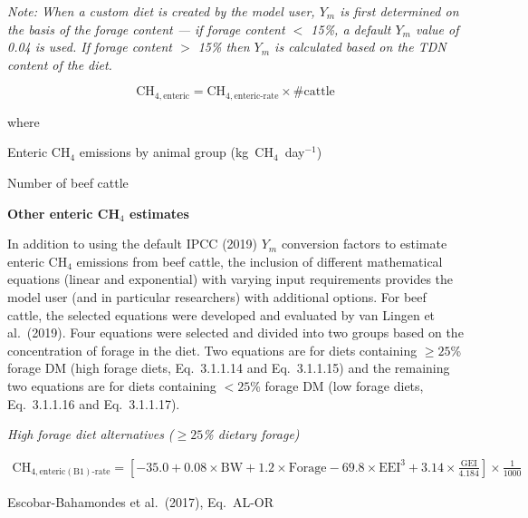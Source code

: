 \noindent\textit{Note: When a custom diet is created by the model user, $Y_m$ is first
determined on the basis of the forage content --- if forage content $<$ 15\%, a default
$Y_m$ value of 0.04 is used. If forage content $>$ 15\% then $Y_m$ is calculated based
on the TDN content of the diet.}

\begin{equation}
    \mathrm{CH}_{4,\mathrm{enteric}} =
        \mathrm{CH}_{4,\mathrm{enteric\text{-}rate}} \times \#\mathrm{cattle}
    \tag{Eq.\ 3.1.1.13}
\end{equation}

\noindent where
\begin{description}[font=\normalfont, leftmargin=9em, style=sameline, nosep]
    \item[$\mathrm{CH}_{4,\mathrm{enteric}}$] Enteric CH$_4$ emissions by animal group
          (kg~CH$_4$~day$^{-1}$)
    \item[$\#\mathrm{cattle}$] Number of beef cattle
\end{description}

\bigskip
\noindent\textbf{Other enteric CH$_4$ estimates}

In addition to using the default IPCC (2019) $Y_m$ conversion factors to estimate
enteric CH$_4$ emissions from beef cattle, the inclusion of different mathematical
equations (linear and exponential) with varying input requirements provides the model
user (and in particular researchers) with additional options. For beef cattle, the
selected equations were developed and evaluated by van Lingen et al.\ (2019). Four
equations were selected and divided into two groups based on the concentration of forage
in the diet. Two equations are for diets containing $\geq 25$\% forage DM (high forage
diets, Eq.~3.1.1.14 and Eq.~3.1.1.15) and the remaining two equations are for diets
containing $< 25$\% forage DM (low forage diets, Eq.~3.1.1.16 and Eq.~3.1.1.17).

\noindent\textit{High forage diet alternatives ($\geq 25$\% dietary forage)}

\begin{multline}
    \mathrm{CH}_{4,\mathrm{enteric}(\mathrm{B1})\mathrm{\text{-}rate}} =
        \left[-35.0 + 0.08 \times \mathrm{BW} + 1.2 \times \mathrm{Forage}
        - 69.8 \times \mathrm{EEI}^{3}
        + 3.14 \times \frac{\mathrm{GEI}}{4.184}\right]
        \times \frac{1}{1000}
    \tag{Eq.\ 3.1.1.14}
\end{multline}

\noindent Escobar-Bahamondes et al.\ (2017), Eq.~AL-OR

